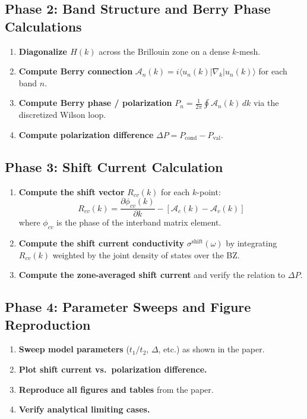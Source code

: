 \documentclass[11pt,a4paper]{article}
\begin{document}
\subsection{Phase 2: Band Structure and Berry Phase Calculations}
\begin{enumerate}[label=\textbf{2.\arabic*}]
  \item \textbf{Diagonalize $H(k)$} across the Brillouin zone on a dense $k$-mesh.
  \item \textbf{Compute Berry connection} $\mathcal{A}_n(k) = i \langle u_n(k) | \nabla_k | u_n(k) \rangle$ for each band $n$.
  \item \textbf{Compute Berry phase / polarization} $P_n = \frac{1}{2\pi} \oint \mathcal{A}_n(k) \, dk$ via the discretized Wilson loop.
  \item \textbf{Compute polarization difference} $\Delta P = P_{\text{cond}} - P_{\text{val}}$.
\end{enumerate}

\subsection{Phase 3: Shift Current Calculation}
\begin{enumerate}[label=\textbf{3.\arabic*}]
  \item \textbf{Compute the shift vector} $R_{cv}(k)$ for each $k$-point:
    \begin{equation*}
      R_{cv}(k) = \frac{\partial \phi_{cv}(k)}{\partial k} - [\mathcal{A}_c(k) - \mathcal{A}_v(k)]
    \end{equation*}
    where $\phi_{cv}$ is the phase of the interband matrix element.
  \item \textbf{Compute the shift current conductivity} $\sigma^{\text{shift}}(\omega)$ by integrating $R_{cv}(k)$ weighted by the joint density of states over the BZ.
  \item \textbf{Compute the zone-averaged shift current} and verify the relation to $\Delta P$.
\end{enumerate}

\subsection{Phase 4: Parameter Sweeps and Figure Reproduction}
\begin{enumerate}[label=\textbf{4.\arabic*}]
  \item \textbf{Sweep model parameters} ($t_1/t_2$, $\Delta$, etc.) as shown in the paper.
  \item \textbf{Plot shift current vs.\ polarization difference.}
  \item \textbf{Reproduce all figures and tables} from the paper.
  \item \textbf{Verify analytical limiting cases.}
\end{enumerate}
\end{document}
